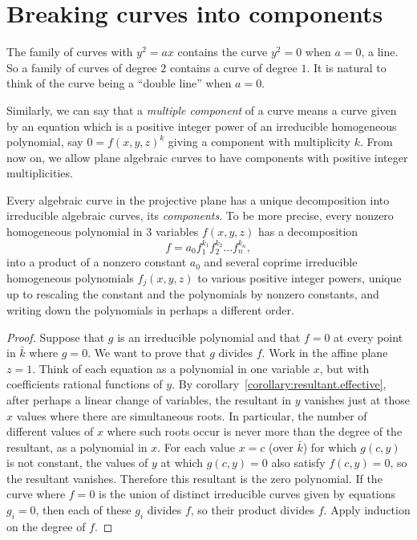 \section{Breaking curves into components}
\begin{example}
The family of curves with \(y^2=ax\) contains the curve \(y^2=0\) when \(a=0\), a line.
So a family of curves of degree \(2\) contains a curve of degree \(1\).
It is natural to think of the curve being a ``double line'' when \(a=0\).
\end{example}
Similarly, we can say that a \emph{multiple component} of a curve means a curve given by an equation which is a positive integer power of an irreducible homogeneous polynomial, say \(0=f(x,y,z)^k\) giving a component with multiplicity \(k\).
From now on, we allow plane algebraic curves to have components with positive integer multiplicities.
\begin{theorem}[Study]\label{theorem:Study}
Every algebraic curve in the projective plane has a unique decomposition into irreducible algebraic curves, its \emph{components}.
To be more precise, every nonzero homogeneous polynomial in \(3\) variables \(f(x,y,z)\) has a decomposition
\[
f=a_0 f_1^{k_1} f_2^{k_2} \dots f_n^{k_n},
\]
into a product of a nonzero constant \(a_0\) and several coprime irreducible homogeneous polynomials \(f_j(x,y,z)\) to various positive integer powers, unique up to rescaling the constant and the polynomials by nonzero constants, and writing down the polynomials in perhaps a different order.
\end{theorem}
\begin{proof}
Suppose that \(g\) is an irreducible polynomial and that \(f=0\) at every point in \(\bar{k}\) where \(g=0\). 
We want to prove that \(g\) divides \(f\).
Work in the affine plane \(z=1\).
Think of each equation as a polynomial in one variable \(x\), but with coefficients rational functions of \(y\).
By corollary~\vref{corollary:resultant.effective}, after perhaps a linear change of variables, the resultant in \(y\) vanishes just at those \(x\) values where there are simultaneous roots.
In particular, the number of different values of \(x\) where such roots occur is never more than the degree of the resultant, as a polynomial in \(x\).
For each value \(x=c\) (over \(\bar{k}\)) for which \(g(c,y)\) is not constant, the values of \(y\) at which \(g(c,y)=0\) also satisfy \(f(c,y)=0\), so the resultant vanishes.
Therefore this resultant is the zero polynomial.
If the curve where \(f=0\) is the union of distinct irreducible curves given by equations \(g_i=0\), then each of these \(g_i\) divides \(f\), so their product divides \(f\).
Apply induction on the degree of \(f\).
\end{proof}

